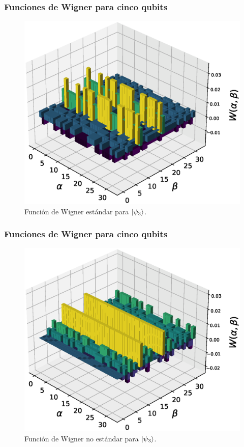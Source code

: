 \documentclass[10pt,spanish]{beamer}
\begin{document}
  \begin{frame}
    \frametitle{Funciones de Wigner para cinco qubits}

    \begin{figure}[h]
      \centering
      \includegraphics[scale=0.35]{
        paper/pres_graphs/32_woo_3.eps
      }
      \caption{
        Función de Wigner estándar para $\ket{\psi_3}$.
      }
      \label{fig:wigner-standard-2-5-s3}
    \end{figure}
  \end{frame}

  \begin{frame}
    \frametitle{Funciones de Wigner para cinco qubits}

    \begin{figure}[h]
      \centering
      \includegraphics[scale=0.35]{
        paper/pres_graphs/32_kan_3.eps
      }
      \caption{
        Función de Wigner no estándar para $\ket{\psi_3}$.
      }
      \label{fig:wigner-kantor-2-5-s3}
    \end{figure}
  \end{frame}
\end{document}
